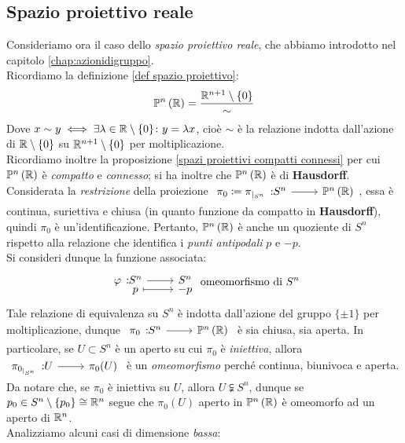 \subsection{Spazio proiettivo reale}
Consideriamo ora il caso dello \textit{spazio proiettivo reale}, che abbiamo introdotto nel capitolo \autoref{chap:azionidigruppo}. \\
Ricordiamo la definizione \ref{def spazio proiettivo}:
\begin{equation*}
	\proj[n]{\realset}=\frac{\realset^{n+1}\setminus\{0\}}{\sim}
\end{equation*}
Dove $x\sim y \iff \exists\lambda\in\mathbb{R}\setminus\{0\} \colon y=\lambda x$, cioè $\sim$ è la relazione indotta dall'azione di $\mathbb{R}\setminus\{0\}$ su $\mathbb{R}^{n+1}\setminus\{0\}$ per moltiplicazione.\\
Ricordiamo inoltre la proposizione \ref{spazi proiettivi compatti connessi} per cui $\proj[n]{\realset}$ è \textit{compatto} e \textit{connesso}; si ha inoltre che $\proj[n]{\realset}$ è di \textbf{Hausdorff}.\\
Considerata la \textit{restrizione} della proiezione $\funz {\pi_0\coloneqq \pi_{\mid_{S^n}}} {S^n} {\proj[n]{\realset}}$, essa è continua, suriettiva e chiusa (in quanto funzione da compatto in \textbf{Hausdorff}), quindi $\pi_0$ è un'identificazione. Pertanto, $\proj[n]{\realset}$ è anche un quoziente di $S^n$ rispetto alla relazione che identifica i \textit{punti antipodali} $p$ e $-p$.\\
Si consideri dunque la funzione associata:
\begin{equation}
	\funztot \phi {S^n} {S^n} p {-p}\text{ omeomorfismo di }S^n
\end{equation}
Tale relazione di equivalenza su $S^n$ è indotta dall'azione del gruppo $\{\pm 1\}$ per moltiplicazione, dunque $\funz {\pi_0} {S^n} {\proj[n]{\realset}}$ è sia chiusa, sia aperta. In particolare, se $U\subset S^n$ è un aperto su cui $\pi_0$ è \textit{iniettiva}, allora $\funz {\pi_{0_{\mid_{S^n}}}} U {\pi_0(U)}$ è un \textit{omeomorfismo} perché continua, biunivoca e aperta.\\
Da notare che, se $\pi_0$ è iniettiva su $U$, allora $U\subsetneqq S^n$, dunque se $p_0\in S^n\setminus\{p_0\}\cong\mathbb{R}^n$ segue che $\pi_0(U)$ aperto in $\proj[n]{\realset}$ è omeomorfo ad un aperto di $\mathbb{R}^n$.\\
Analizziamo alcuni casi di dimensione \textit{bassa}:
